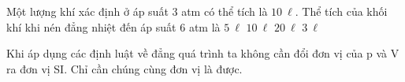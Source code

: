 \begin{vidu} %
	Một lượng khí xác định ở áp suất 3 atm có thể tích là $10\ \ell$. Thể tích của khối khí khi nén đẳng nhiệt đến áp suất 6 atm là
	\choice
	{\True $5\ \ell$}
	{$10\ \ell$}
	{$20\ \ell$}
	{$3\ \ell$}
	
	\begin{note}
		Khi áp dụng các định luật về đẳng quá trình ta không cần đổi đơn vị của p và V ra đơn vị SI. Chỉ cần chúng cùng đơn vị là được.
	\end{note}
\end{vidu}



